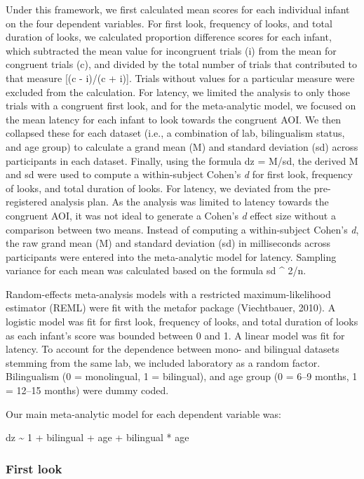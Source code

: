 \documentclass[english,,man,floatsintext]{apa6}
\begin{document}
Under this framework, we first calculated mean scores for each individual infant on the four dependent variables. For first look, frequency of looks, and total duration of looks, we calculated proportion difference scores for each infant, which subtracted the mean value for incongruent trials (i) from the mean for congruent trials (c), and divided by the total number of trials that contributed to that measure {[}(c - i)/(c + i){]}. Trials without values for a particular measure were excluded from the calculation. For latency, we limited the analysis to only those trials with a congruent first look, and for the meta-analytic model, we focused on the mean latency for each infant to look towards the congruent AOI. We then collapsed these for each dataset (i.e., a combination of lab, bilingualism status, and age group) to calculate a grand mean (M) and standard deviation (sd) across participants in each dataset. Finally, using the formula dz = M/sd, the derived M and sd were used to compute a within-subject Cohen's \emph{d} for first look, frequency of looks, and total duration of looks. For latency, we deviated from the pre-registered analysis plan. As the analysis was limited to latency towards the congruent AOI, it was not ideal to generate a Cohen's \emph{d} effect size without a comparison between two means. Instead of computing a within-subject Cohen's \emph{d}, the raw grand mean (M) and standard deviation (sd) in milliseconds across participants were entered into the meta-analytic model for latency. Sampling variance for each mean was calculated based on the formula sd \^{} 2/n.

Random-effects meta-analysis models with a restricted maximum-likelihood estimator (REML) were fit with the metafor package (Viechtbauer, 2010). A logistic model was fit for first look, frequency of looks, and total duration of looks as each infant's score was bounded between 0 and 1. A linear model was fit for latency. To account for the dependence between mono- and bilingual datasets stemming from the same lab, we included laboratory as a random factor. Bilingualism (0 = monolingual, 1 = bilingual), and age group (0 = 6--9 months, 1 = 12--15 months) were dummy coded.

Our main meta-analytic model for each dependent variable was:

dz \textasciitilde{} 1 + bilingual + age + bilingual * age

\hypertarget{first-look-1}{%
\subsubsection{First look}\label{first-look-1}}
\end{document}

